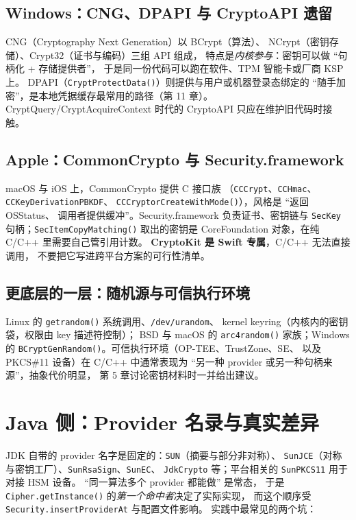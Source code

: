 \documentclass[12pt,a4paper,fontset=fandol]{ctexbook}
\newcommand{\Fn}[1]{\texttt{#1()}}
\newcommand{\Tp}[1]{\texttt{#1}}
\newcommand{\CppJava}{C/C++}
\begin{document}
\subsection{Windows：CNG、DPAPI 与 CryptoAPI 遗留}

CNG（Cryptography Next Generation）以 BCrypt（算法）、
NCrypt（密钥存储）、Crypt32（证书与编码）三组 API 组成，
特点是\emph{内核参与}：密钥可以做 ``句柄化 + 存储提供者''，
于是同一份代码可以跑在软件、TPM 智能卡或厂商 KSP 上。
DPAPI（\Fn{CryptProtectData}）则提供与用户或机器登录态绑定的
``随手加密''，是本地凭据缓存最常用的路径（第 11 章）。
CryptQuery/CryptAcquireContext 时代的 CryptoAPI 只应在维护旧代码时接触。

\subsection{Apple：CommonCrypto 与 Security.framework}

macOS 与 iOS 上，CommonCrypto 提供 C 接口族
（\Tp{CCCrypt}、\Tp{CCHmac}、\Tp{CCKey\allowbreak{}DerivationPBKDF}、
\Fn{CCCryptor\allowbreak{}Create\allowbreak{}With\allowbreak{}Mode}），风格是 ``返回 OSStatus、
调用者提供缓冲''。Security.framework 负责证书、密钥链与
\Tp{SecKey} 句柄；\Fn{Sec\allowbreak{}Item\allowbreak{}Copy\allowbreak{}Matching} 取出的密钥是
CoreFoundation 对象，在纯 C/C++ 里需要自己管引用计数。
\textbf{CryptoKit 是 Swift 专属}，\CppJava{} 无法直接调用，
不要把它写进跨平台方案的可行性清单。

\subsection{更底层的一层：随机源与可信执行环境}

Linux 的 \Fn{getrandom} 系统调用、\Tp{/dev/urandom}、
kernel keyring（内核内的密钥袋，权限由 key 描述符控制）；
BSD 与 macOS 的 \Fn{arc4random} 家族；Windows 的
\Fn{BCryptGenRandom}。可信执行环境（OP-TEE、TrustZone、SE、
以及 PKCS\#11 设备）在 \CppJava{} 中通常表现为
``另一种 provider 或另一种句柄来源''，抽象代价明显，
第 5 章讨论密钥材料时一并给出建议。

\section{Java 侧：Provider 名录与真实差异}

JDK 自带的 provider 名字是固定的：\Tp{SUN}（摘要与部分非对称）、
\Tp{SunJCE}（对称与密钥工厂）、\Tp{SunRsaSign}、\Tp{SunEC}、
\Tp{JdkCrypto} 等；平台相关的 \Tp{SunPKCS11} 用于对接 HSM 设备。
``同一算法多个 provider 都能做'' 是常态，
于是 \Fn{Cipher.getInstance} 的\emph{第一个命中者}决定了实际实现，
而这个顺序受 \Tp{Security.insertProviderAt} 与配置文件影响。
实践中最常见的两个坑：
\end{document}

